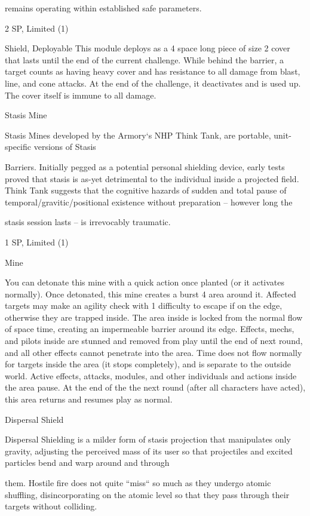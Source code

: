 remains operating within established safe parameters.

2 SP, Limited (1)

Shield, Deployable
This module deploys as a 4 space long piece of size 2 cover that lasts until the end of the current
challenge. While behind the barrier, a target counts as having heavy cover and has resistance to
all damage from blast, line, and cone attacks. At the end of the challenge, it deactivates and is
used up. The cover itself is immune to all damage.


Stasis Mine

Stasis Mines developed by the Armory‘s NHP Think Tank, are portable, unit-specific versions of Stasis

Barriers. Initially pegged as a potential personal shielding device, early tests proved that stasis is as-yet
detrimental to the individual inside a projected field. Think Tank suggests that the cognitive hazards of
sudden and total pause of temporal/gravitic/positional existence without preparation -- however long the

stasis session lasts -- is irrevocably traumatic.

1 SP,  Limited (1)


Mine

You can detonate this mine with a quick action once planted (or it activates normally). Once
detonated, this mine creates a burst 4 area around it. Affected targets may make an agility check
with 1 difficulty to escape if on the edge, otherwise they are trapped inside. The area inside is
locked from the normal flow of space time, creating an impermeable barrier around its edge.
Effects, mechs, and pilots inside are stunned and removed from play until the end of next round,
and all other effects cannot penetrate into the area. Time does not flow normally for targets
inside the area (it stops completely), and is separate to the outside world. Active effects, attacks,
modules, and other individuals and actions inside the area pause. At the end of the the next
round (after all characters have acted), this area returns and resumes play as normal.


Dispersal Shield

Dispersal Shielding is a milder form of stasis projection that manipulates only gravity, adjusting the
perceived mass of its user so that projectiles and excited particles bend and warp around and through




them. Hostile fire does not quite “miss“ so much as they undergo atomic shuffling, disincorporating on the
atomic level so that they pass through their targets without colliding.

